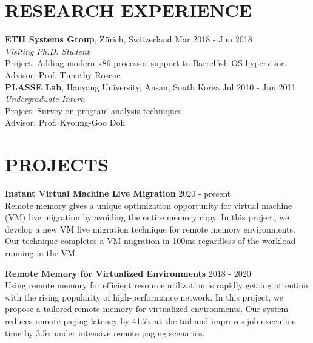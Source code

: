 \documentclass[margin]{res}
\begin{document}
\begin{resume}
\section{RESEARCH EXPERIENCE}
\par
\textbf{ETH Systems Group}, Z{\"u}rich, Switzerland \hfill Mar 2018 - Jun 2018 \\
\textit{Visiting Ph.D. Student} \\
Project: Adding modern x86 processor support to Barrelfish OS hypervisor. \\
Advisor: Prof. Timothy Roscoe \\


\vspace{-1.5em}
\textbf{PLASSE Lab}, Hanyang University, Ansan, South Korea \hfill Jul 2010 - Jun 2011 \\
\textit{Undergraduate Intern} \\
Project: Survey on program analysis techniques. \\
Advisor: Prof. Kyoung-Goo Doh \\

\vspace{-1.2em}
\section{PROJECTS}
\par
\textbf{Instant Virtual Machine Live Migration} \hfill 2020 - present \\
Remote memory gives a unique optimization opportunity for virtual machine (VM) live migration by avoiding the entire memory copy. In this project, we develop a new VM live migration technique for remote memory environments. Our technique completes a VM migration in 100ms regardless of the workload running in the VM.

\par
\textbf{Remote Memory for Virtualized Environments} \hfill 2018 - 2020 \\
Using remote memory for efficient resource utilization is rapidly getting attention with the rising popularity of high-performance network. In this project, we propose a tailored remote memory for virtualized environments. Our system reduces remote paging latency by 41.7x at the tail and improves job execution time by 3.5x under intensive remote paging scenarios.


\end{resume}
\end{document}
